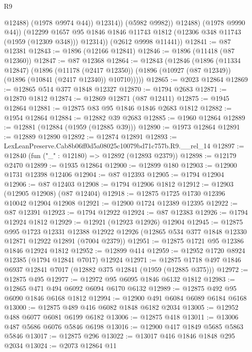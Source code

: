 \begin{lexlean}{R9}
\begin{coremodule}
                      @12488)
                    (@1978 @9974 @44))
                  @12314))
              (@5982 @9982))
            @12488)
          (@1978 @9990 @44))
        (@12299
          @1657
          @95
          @1846
          @1846
          @11743
          @1812
          (@12306 @348 @11743 (@1959 (@12309 @348)))
          @12314))
      (@2612 @9998 @11441))
@12841 := @87 @12381
@12843 := @1896 (@12166 @12841)
@12846 := @1896 (@11418 (@87 @12360))
@12847 := @87 @12368
@12864 := @12843
    (@12846
      (@1896
        (@11334 @12847)
        (@1896
          (@11178 (@2417 @12350))
          (@1896 (@10927 (@87 @12349)) (@1896 (@10841 (@2417 @12340)) @10710)))))
@12865 := @2023 @12864
@12869 := @12865 @514 @377 @1848 @12327
@12870 := @1794 @2683
@12871 := @12870 @1812
@12874 := @12869 @12871 (@87 @12411)
@12875 := @1945 @12864
@12881 := @12875 @83 @95 @1846 @1846 @2683 @1812
@12882 := @1954 @12864
@12884 := @12882 @39 @2683
@12885 := @1960 @12864
@12889 := @12881 (@12884 (@1959 (@12885 @39)))
@12890 := @1973 @12864
@12891 := @12889 @12890
@12892 := @12874 @12891
@12893 := LexLeanPreserve.Cab8b06ff0d5a08025c10079bd71c757b.R9.__rel_14
@12897 := @12840 (fun ("_" : @12180) => @12892 (@12893 @2379))
@12898 := @12179 @2470
@12899 := @1935 @12864
@12900 := @12899 @180
@12903 := @12900 @1731 @12398 @12406
@12904 := @87 @12393
@12905 := @1794 @12904
@12906 := @87 @12403
@12908 := @1794 @12906 @1812
@12912 := @12903 (@12905 @12908) (@87 @12404)
@12918 := @12875 @1725 @1730 @12396 @10042 @12904 @12908
@12921 := @12900 @1724 @12389 @12395
@12922 := @87 @12391
@12923 := @1794 @12922
@12924 := @87 @12383
@12926 := @1794 @12924 @1812
@12929 := @12921 (@12923 @12926) @12904
@12945 := @12875
    @995
    @1723
    @12331
    @12388
    @12922
    @12926
    (@12865 @534 @377 @1848 @12330 @12871 @12922 @12891 (@7004 @2379))
@12951 := @12875 @1721 @95 @12386 @1846 @12924 @1812
@12952 := @12899 @414
@12959 := @12952 @1720 @8924 @12385 (@1794 @12841 @7017) @12924
@12971 := @12875 @1718 @497 @1846 @6937 @12841 @7017 (@12882 @375 @12841 (@1959 (@12885 @375)))
@12972 := @12875 @495
@12977 := @12972 @95 @6095 @1846 @6132 @1812
@12983 := @12865 @471 @494 @6092 @6094 @6170 @6132
@12989 := @12875 @492 @95 @6090 @1846 @6168 @1812
@12994 := @12900 @491 @6084 @6089 @6184 @6168
@13000 := @12875 @489 @416 @6082 @1848 @6182 @2034
@13005 := @12952 @488 @6077 @6081 @6199 @6182
@13006 := @12875 @418
@13011 := @13006 @487 @5686 @6076 @5846 @6198
@13016 := @12900 @417 @1849 @5685 @5863 @5846
@13017 := @12875 @296
@13022 := @13017 @416 @1846 @1848 @295 @2034
@13024 := @2073 @12864 @11

\end{coremodule}
\end{lexlean}
